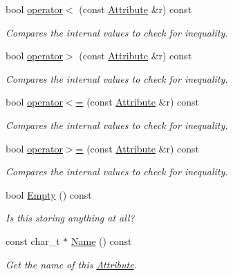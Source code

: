 \begin{DoxyCompactItemize}
bool \hyperlink{classphys_1_1xml_1_1Attribute_ac383f0c514e550fe992b1c0a0f3cbd7a}{operator$<$} (const \hyperlink{classphys_1_1xml_1_1Attribute}{Attribute} \&r) const 
\begin{DoxyCompactList}\small\item\em Compares the internal values to check for inequality. \item\end{DoxyCompactList}\item 
bool \hyperlink{classphys_1_1xml_1_1Attribute_ac778ad4d7aa3a179217de1425e220848}{operator$>$} (const \hyperlink{classphys_1_1xml_1_1Attribute}{Attribute} \&r) const 
\begin{DoxyCompactList}\small\item\em Compares the internal values to check for inequality. \item\end{DoxyCompactList}\item 
bool \hyperlink{classphys_1_1xml_1_1Attribute_a3b73bd409a2b6b9a7d72c3affc96bae1}{operator$<$=} (const \hyperlink{classphys_1_1xml_1_1Attribute}{Attribute} \&r) const 
\begin{DoxyCompactList}\small\item\em Compares the internal values to check for inequality. \item\end{DoxyCompactList}\item 
bool \hyperlink{classphys_1_1xml_1_1Attribute_ab1d63c57891107848492dc3316c95455}{operator$>$=} (const \hyperlink{classphys_1_1xml_1_1Attribute}{Attribute} \&r) const 
\begin{DoxyCompactList}\small\item\em Compares the internal values to check for inequality. \item\end{DoxyCompactList}\item 
bool \hyperlink{classphys_1_1xml_1_1Attribute_a6d0157a562f283e9c87d1cc46b3405cc}{Empty} () const 
\begin{DoxyCompactList}\small\item\em Is this storing anything at all? \item\end{DoxyCompactList}\item 
const char\_\-t $\ast$ \hyperlink{classphys_1_1xml_1_1Attribute_ab4c1186366d975d2086bf81df2ce1135}{Name} () const 
\begin{DoxyCompactList}\small\item\em Get the name of this \hyperlink{classphys_1_1xml_1_1Attribute}{Attribute}. \item\end{DoxyCompactList}\item 

\end{DoxyCompactItemize}
